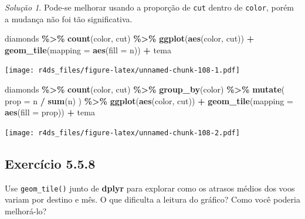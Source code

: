 \documentclass[
]{latex/krantz}
\newenvironment{Shaded}{\begin{snugshade}}{\end{snugshade}}
\newcommand{\AttributeTok}[1]{\textcolor[rgb]{0.13,0.29,0.53}{#1}}
\newcommand{\FunctionTok}[1]{\textcolor[rgb]{0.13,0.29,0.53}{\textbf{#1}}}
\newcommand{\NormalTok}[1]{#1}
\newcommand{\SpecialCharTok}[1]{\textcolor[rgb]{0.81,0.36,0.00}{\textbf{#1}}}
\theoremstyle{definition}
\theoremstyle{definition}
\theoremstyle{definition}
\theoremstyle{definition}
\theoremstyle{remark}
\newtheorem*{solution}{Solução}
\begin{document}
\begin{solution}
Pode-se melhorar usando a proporção de \texttt{cut} dentro de \texttt{color}, porém a mudança não foi tão significativa.

\begin{Shaded}
\begin{Highlighting}[]
\NormalTok{diamonds }\SpecialCharTok{\%\textgreater{}\%}
    \FunctionTok{count}\NormalTok{(color, cut) }\SpecialCharTok{\%\textgreater{}\%}
    \FunctionTok{ggplot}\NormalTok{(}\FunctionTok{aes}\NormalTok{(color, cut)) }\SpecialCharTok{+}
        \FunctionTok{geom\_tile}\NormalTok{(}\AttributeTok{mapping =} \FunctionTok{aes}\NormalTok{(}\AttributeTok{fill =}\NormalTok{ n)) }\SpecialCharTok{+} 
\NormalTok{        tema}
\end{Highlighting}
\end{Shaded}

\texttt{[image: r4ds\_files/figure-latex/unnamed-chunk-108-1.pdf]}

\begin{Shaded}
\begin{Highlighting}[]
\NormalTok{diamonds }\SpecialCharTok{\%\textgreater{}\%}
    \FunctionTok{count}\NormalTok{(color, cut) }\SpecialCharTok{\%\textgreater{}\%}
    \FunctionTok{group\_by}\NormalTok{(color) }\SpecialCharTok{\%\textgreater{}\%}
    \FunctionTok{mutate}\NormalTok{(}
        \AttributeTok{prop =}\NormalTok{ n }\SpecialCharTok{/} \FunctionTok{sum}\NormalTok{(n)}
\NormalTok{    ) }\SpecialCharTok{\%\textgreater{}\%}
    \FunctionTok{ggplot}\NormalTok{(}\FunctionTok{aes}\NormalTok{(color, cut)) }\SpecialCharTok{+}
        \FunctionTok{geom\_tile}\NormalTok{(}\AttributeTok{mapping =} \FunctionTok{aes}\NormalTok{(}\AttributeTok{fill =}\NormalTok{ prop)) }\SpecialCharTok{+} 
\NormalTok{        tema}
\end{Highlighting}
\end{Shaded}

\texttt{[image: r4ds\_files/figure-latex/unnamed-chunk-108-2.pdf]}
\end{solution}

\hypertarget{exr5-5-8}{%
\subsection*{Exercício 5.5.8}\label{exr5-5-8}}

Use \texttt{geom\_tile()} junto de \textbf{dplyr} para explorar como os atrasos médios dos voos variam por destino e mês. O que dificulta a leitura do gráfico? Como você poderia melhorá-lo?
\end{document}
